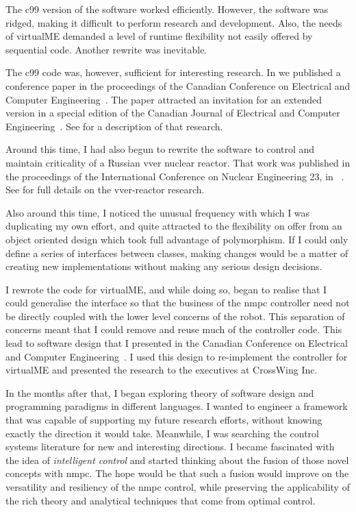 The \ac{c99} version of the software worked efficiently. However, the software
was ridged, making it
difficult to perform research and development. Also, the needs of virtualME
demanded a level of runtime flexibility not easily offered by sequential code.
Another rewrite was inevitable.

The \ac{c99} code was, however, sufficient for interesting research. In
 we published a conference paper in the proceedings of the Canadian
Conference on Electrical and Computer Engineering~\cite{Teatro2013}. The paper
attracted an invitation for an extended version in a special edition of the
Canadian Journal of Electrical and Computer Engineering~\cite{Teatro2014}. See
 for a description of that research.

Around this time, I had also begun to rewrite the software to control and
maintain criticality of a Russian \ac{vver} nuclear reactor. That work was
published in the proceedings of the International Conference on Nuclear
Engineering 23, in ~\cite{Teatro2015}. See 
for full details on the \ac{vver}-reactor research.

Also around this time, I noticed the unusual frequency with which I was
duplicating my own effort, and quite attracted to the flexibility on offer from
an object oriented design which took full advantage of polymorphism. If I could
only define a series of interfaces between classes, making changes would be a
matter of creating new implementations without making any serious design
decisions.

I rewrote the code for virtualME, and while doing so, began to realise that I
could generalise the interface so that the business of the \ac{nmpc} controller
need not be directly coupled with the lower level concerns of the robot. This
separation of concerns meant that I could remove and reuse much of the
controller code. This lead to software design that I presented in the
 Canadian Conference on Electrical and Computer
Engineering~\cite{Teatro2016}. I used this design to re-implement the controller
for virtualME and presented the research to the executives at CrossWing Inc.

In the months after that, I began exploring theory of software design and
programming paradigms in different languages. I wanted to engineer a framework
that was capable of supporting my future research efforts, without knowing
exactly the direction it would take. Meanwhile, I was searching the control
systems literature for new and interesting directions. I became fascinated with
the idea of \emph{intelligent control} and started thinking about the fusion of
those novel concepts with \ac{nmpc}. The hope would be that such a fusion would
improve on the versatility and resiliency of the \ac{nmpc} control, while
preserving the applicability of the rich theory and analytical techniques that
come from optimal control.

